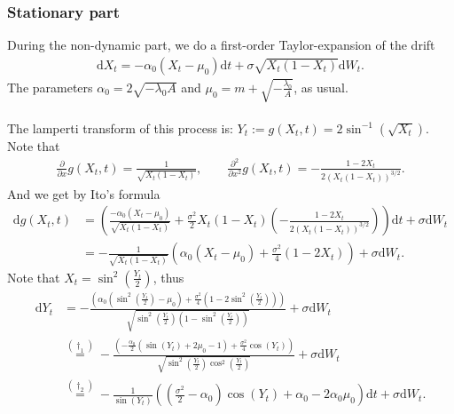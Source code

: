 \subsubsection{Stationary part}
During the non-dynamic part, we do a first-order Taylor-expansion of the drift
\begin{align}
    \mathrm{d}X_t = -\alpha_0\left(X_t - \mu_0\right)\mathrm{d}t + \sigma \sqrt{X_t\left(1 - X_t\right)}\mathrm{d}W_t.
\end{align}
The parameters $\alpha_0 = 2\sqrt{-\lambda_0 A}$ and $\mu_0 = m + \sqrt{-\frac{\lambda_0}{A}}$, as usual.\\\\
The lamperti transform of this process is: $Y_t := g(X_t,t) = 2 \sin^{-1}\left(\sqrt{X_t}\right)$.
Note that
\begin{align}
    \frac{\partial}{\partial x}g(X_t,t) = \frac{1}{\sqrt{X_t\left(1 - X_t\right)}}, \qquad \frac{\partial^2}{\partial x^2}g(X_t,t) = -\frac{1 - 2X_t}{2\left(X_t\left(1 - X_t\right)\right)^{3/2}}.
\end{align}
And we get by Ito's formula
\begin{align}
    \mathrm{d}g(X_t, t) &= \left(\frac{-\alpha_0\left(X_t - \mu_0\right)}{\sqrt{X_t\left(1 - X_t\right)}} + \frac{\sigma^2}{2}X_t\left(1 - X_t\right)\left(-\frac{1 - 2X_t}{2\left(X_t\left(1 - X_t\right)\right)^{3/2}}\right)\right)\mathrm{d}t + \sigma\mathrm{d}W_t \nonumber \\
    &= -\frac{1}{\sqrt{X_t\left(1 - X_t\right)}}\left(\alpha_0\left(X_t - \mu_0\right) + \frac{\sigma^2}{4}\left(1 - 2X_t\right)\right) + \sigma\mathrm{d}W_t.
\end{align}
Note that $X_t = \sin^2\left(\frac{Y_t}{2}\right)$, thus
\begin{align}
    \mathrm{d}Y_t & = -\frac{\left(\alpha_0\left(\sin^2\left(\frac{Y_t}{2}\right) - \mu_0\right) + \frac{\sigma^2}{4}\left(1 - 2\sin^2\left(\frac{Y_t}{2}\right)\right)\right)}{\sqrt{\sin^2\left(\frac{Y_t}{2}\right)\left(1 - \sin^2\left(\frac{Y_t}{2}\right)\right)}} + \sigma\mathrm{d}W_t \nonumber \\
    & \overset{(\dagger_1)}{=} -\frac{\left(-\frac{\alpha_0}{2}\left(\sin\left(Y_t\right) + 2\mu_0 - 1\right) + \frac{\sigma^2}{4}\cos(Y_t)\right)}{\sqrt{\sin^2\left(\frac{Y_t}{2}\right)\cos^2\left(\frac{Y_t}{2}\right)}} + \sigma\mathrm{d}W_t \nonumber \\
    & \overset{(\dagger_2)}{=} -\frac{1}{\sin\left(Y_t\right)}\left(\left(\frac{\sigma^2}{2}-\alpha_0\right)\cos(Y_t) + \alpha_0 - 2\alpha_0\mu_0\right)\mathrm{d}t + \sigma \mathrm{d}W_t. \label{eq:JacobiLampertiSDE}
\end{align}
